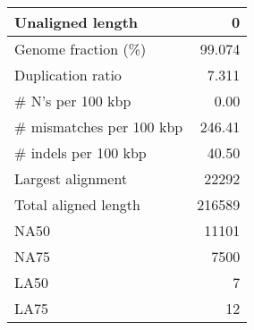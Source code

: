 \documentclass[12pt,a4paper]{article}
\begin{document}
\begin{table}[ht]
\begin{center}
\begin{tabular}{|l*{1}{|r}|}
Unaligned length & 0 \\ \hline
Genome fraction (\%) & 99.074 \\ \hline
Duplication ratio & 7.311 \\ \hline
\# N's per 100 kbp & 0.00 \\ \hline
\# mismatches per 100 kbp & 246.41 \\ \hline
\# indels per 100 kbp & 40.50 \\ \hline
Largest alignment & 22292 \\ \hline
Total aligned length & 216589 \\ \hline
NA50 & 11101 \\ \hline
NA75 & 7500 \\ \hline
LA50 & 7 \\ \hline
LA75 & 12 \\ \hline
\end{tabular}
\end{center}
\end{table}
\end{document}
